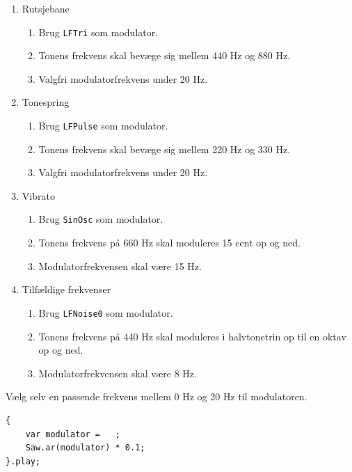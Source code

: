             \begin{enumerate}
            \item Rutsjebane
\begin{enumerate} 
 \item Brug \texttt{LFTri} som modulator.
\item Tonens frekvens skal bevæge sig mellem 440 Hz og 880 Hz.
\item Valgfri modulatorfrekvens under 20 Hz.
\end{enumerate}
\item Tonespring
\begin{enumerate} 
 \item Brug \texttt{LFPulse} som modulator.
\item Tonens frekvens skal bevæge sig mellem 220 Hz og 330 Hz.
\item Valgfri modulatorfrekvens under 20 Hz.
\end{enumerate}
\item Vibrato
\begin{enumerate} 
 \item Brug \texttt{SinOsc} som modulator.
\item Tonens frekvens på 660 Hz skal moduleres 15 cent op og ned.
\item Modulatorfrekvensen skal være 15 Hz.
\end{enumerate}
\item Tilfældige frekvenser
\begin{enumerate} 
 \item Brug \texttt{LFNoise0} som modulator.
\item Tonens frekvens på 440 Hz skal moduleres i halvtonetrin op til en oktav op og ned.
\item Modulatorfrekvensen skal være 8 Hz. 
\end{enumerate}
            \end{enumerate}

Vælg selv en passende frekvens mellem 0 Hz og 20 Hz til modulatoren.

\begin{listing}[H]
\begin{verbatim}
{
    var modulator =   ;
    Saw.ar(modulator) * 0.1;
}.play;
\end{verbatim}
\caption{Frekvensmodulation}
\end{listing}
